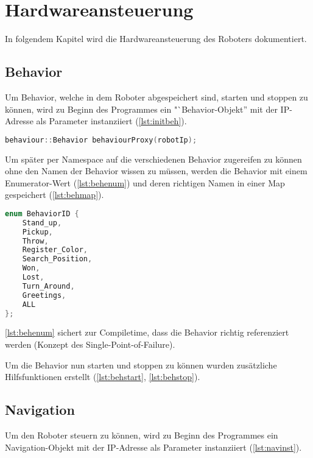 \chapter{Hardwareansteuerung}

    In folgendem Kapitel wird die Hardwareansteuerung des Roboters dokumentiert.

    \section{Behavior}

        Um Behavior, welche in dem Roboter abgespeichert sind, starten und
        stoppen zu können, wird zu Beginn des Programmes ein
        "`Behavior-Objekt'' mit der \ac{IP}-Adresse als Parameter instanziiert
        (\autoref{lst:initbeh}).

\begin{lstlisting}[language=c++,
                   caption={Initialisierung Behavior},
                   label={lst:initbeh}]
behaviour::Behavior behaviourProxy(robotIp);
\end{lstlisting}

        Um später per Namespace auf die verschiedenen Behavior zugereifen zu
        können ohne den Namen der Behavior wissen zu müssen, werden die
        Behavior mit einem Enumerator-Wert (\autoref{lst:behenum}) und deren
        richtigen Namen in einer Map gespeichert (\autoref{lst:behmap}).

\begin{lstlisting}[language=c++,
                   caption={Behavior Enumerator},
                   label={lst:behenum}]
enum BehaviorID {
    Stand_up,
    Pickup,
    Throw,
    Register_Color,
    Search_Position,
    Won,
    Lost,
    Turn_Around,
    Greetings,
    ALL
};
\end{lstlisting}

        \autoref{lst:behenum} sichert zur Compiletime, dass die Behavior
        richtig referenziert werden (Konzept des Single-Point-of-Failure).

        Um die Behavior nun starten und stoppen zu können wurden zusätzliche
        Hilfsfunktionen erstellt
        (\autoref{lst:behstart}, \autoref{lst:behstop}).

    \section{Navigation}

        Um den Roboter steuern zu können, wird zu Beginn des Programmes ein
        Navigation-Objekt mit der \ac{IP}-Adresse als Parameter instanziiert
        (\autoref{lst:navinst}).

